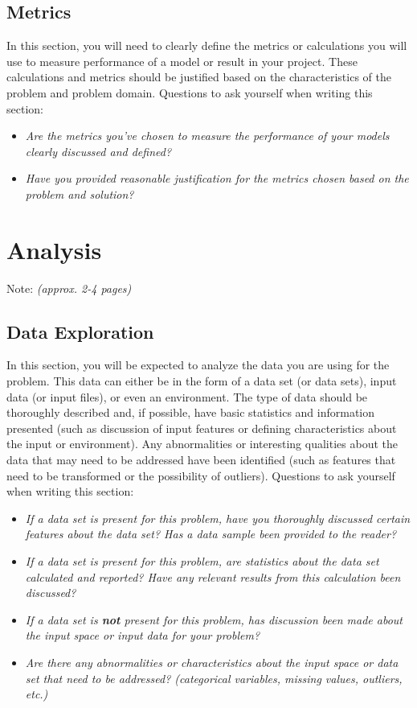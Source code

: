 \documentclass{article}
\begin{document}
\subsection{Metrics}\label{metrics}

In this section, you will need to clearly define the metrics or
calculations you will use to measure performance of a model or result in
your project. These calculations and metrics should be justified based
on the characteristics of the problem and problem domain. Questions to
ask yourself when writing this section:

\begin{itemize}
\item
  \emph{Are the metrics you've chosen to measure the performance of your
  models clearly discussed and defined?}
\item
  \emph{Have you provided reasonable justification for the metrics
  chosen based on the problem and solution?}
\end{itemize}

\section{Analysis}

Note: \emph{(approx. 2-4 pages)}

\subsection{Data Exploration}\label{data-exploration}

In this section, you will be expected to analyze the data you are using
for the problem. This data can either be in the form of a data set (or
data sets), input data (or input files), or even an environment. The
type of data should be thoroughly described and, if possible, have basic
statistics and information presented (such as discussion of input
features or defining characteristics about the input or environment).
Any abnormalities or interesting qualities about the data that may need
to be addressed have been identified (such as features that need to be
transformed or the possibility of outliers). Questions to ask yourself
when writing this section:

\begin{itemize}
\item
  \emph{If a data set is present for this problem, have you thoroughly
  discussed certain features about the data set? Has a data sample been
  provided to the reader?}
\item
  \emph{If a data set is present for this problem, are statistics about
  the data set calculated and reported? Have any relevant results from
  this calculation been discussed?}
\item
  \emph{If a data set is \textbf{not} present for this problem, has
  discussion been made about the input space or input data for your
  problem?}
\item
  \emph{Are there any abnormalities or characteristics about the input
  space or data set that need to be addressed? (categorical variables,
  missing values, outliers, etc.)}
\end{itemize}
\end{document}
